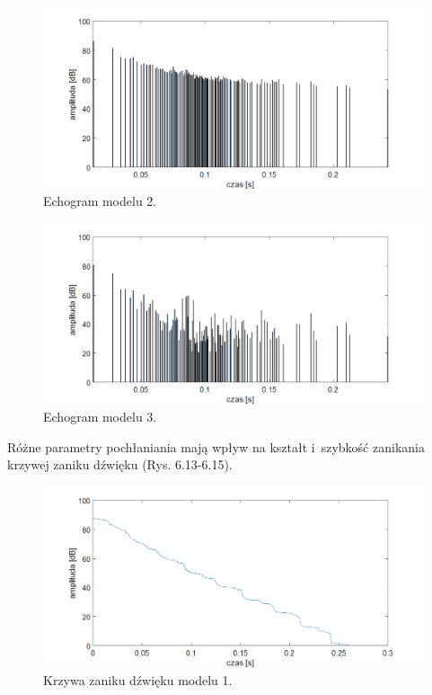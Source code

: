 \begin{figure}[H]
        \centering
                \centering
                \includegraphics[width=16cm]{echo2z}
	\caption{Echogram modelu 2.}
\end{figure}

\begin{figure}[H]
        \centering
                \centering
                \includegraphics[width=16cm]{echoz3}
	\caption{Echogram modelu 3.}
\end{figure}

Różne parametry pochłaniania mają wpływ na kształt i~szybkość zanikania krzywej zaniku dźwięku (Rys. 6.13-6.15).

\begin{figure}[H]
        \centering
                \centering
                \includegraphics[width=16cm]{zanikz1}
	\caption{Krzywa zaniku dźwięku modelu 1.}
\end{figure}

